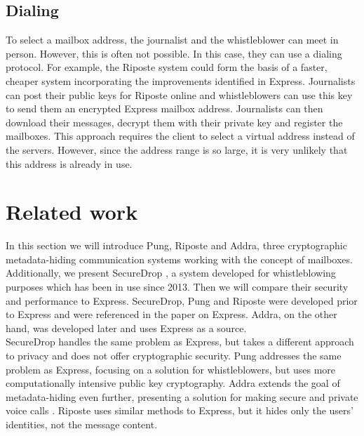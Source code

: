 \documentclass[a4paper]{article}
\begin{document}
\subsection{Dialing}
To select a mailbox address, the journalist and the whistleblower can meet in person. However, this is often not possible. In this case, they can use a dialing protocol. For example, the Riposte system could form the basis of a faster, cheaper system incorporating the improvements identified in Express. Journalists can post their public keys for Riposte online and whistleblowers can use this key to send them an encrypted Express mailbox address. Journalists can then download their messages, decrypt them with their private key and register the mailboxes. This approach requires the client to select a virtual address instead of the servers. However, since the address range is so large, it is very unlikely that this address is already in use. 

\section{Related work} %


\label{sec:relwork}
In this section we will introduce Pung, Riposte and Addra, three cryptographic metadata-hiding communication systems working with the concept of mailboxes. Additionally, we present SecureDrop \citep{securedrop}, a system developed for whistleblowing purposes which has been in use since 2013. Then we will compare their security and performance to Express. SecureDrop, Pung and Riposte were developed prior to Express and were referenced in the paper on Express. Addra, on the other hand, was developed later and uses Express as a source.\\ 
SecureDrop handles the same problem as Express, but takes a different approach to privacy and does not offer cryptographic security. Pung addresses the same problem as Express, focusing on a solution for whistleblowers, but uses more computationally intensive public key cryptography. Addra extends the goal of metadata-hiding even further, presenting a solution for making secure and private voice calls \citep{Ahmad2021}. Riposte uses similar methods to Express, but it hides only the users' identities, not the message content.
\end{document}
